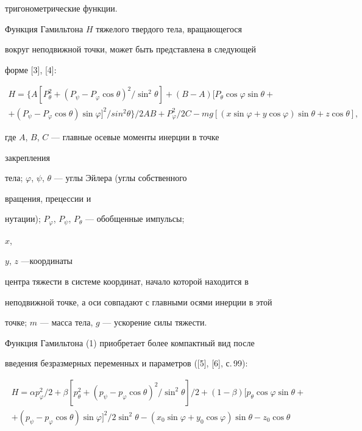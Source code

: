 тригонометрические функции.





Функция Гамильтона $H$ тяжелого твердого тела, вращающегося


вокруг неподвижной точки, может быть представлена в следующей


форме [3], [4]:


\begin{multline}


H=\{A[P^2_\theta+(P_\psi-P_\varphi\cos\theta)^2


/\sin^2\theta]+(B-A)[P_\theta\cos\varphi\sin\theta+ \\


+(P_\psi-P_\varphi\cos\theta)\sin\varphi]^2/sin^2\theta\}/2AB+


P^2_\varphi/2C-mg[(x\sin\varphi+y\cos\varphi)


\sin\theta+z\cos\theta],


\end{multline}


где $A$, $B$, $C$ --- главные осевые моменты инерции в точке


закрепления


тела; $\varphi$, $\psi$, $\theta$ --- углы Эйлера (углы собственного


вращения, прецессии и


нутации); $P_\varphi$, $P_\psi$, $P_\theta$ --- обобщенные импульсы;


$x$,


$y$, $z$ ---координаты


центра тяжести в системе координат, начало которой находится в


неподвижной точке, а оси совпадают с главными осями инерции в этой


точке; $m$ --- масса тела, $g$ --- ускорение силы тяжести.





Функция Гамильтона (1) приобретает более компактный вид после


введения безразмерных переменных и параметров ([5], [6], с.\,99):


\begin{multline}


H=\alpha p^2_\varphi/2+\beta[p^2_\theta+(p_\psi-p_\varphi


\cos\theta)^2/\sin^2\theta]/2+(1-\beta)[p_\theta\cos\varphi\sin\theta+\\


+(p_\psi-p_\varphi\cos\theta)\sin\varphi]^2/2\sin^2\theta-


(x_0\sin\varphi+y_0\cos\varphi)\sin\theta-z_0\cos\theta


\end{multline}



